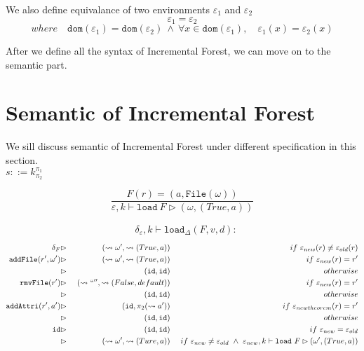 \documentclass[10pt,twoside,a4paper]{article}
\theoremstyle{theorem}
\theoremstyle{lemma}
\theoremstyle{property}
\theoremstyle{definition}
\theoremstyle{assumption}
\def\snd{\pi_2}
\def\id{\mathtt{id}}
\begin{document}
We also define equivalance of two environments $\varepsilon_1$ and $\varepsilon_2$
\begin{displaymath}
	\varepsilon_1 = \varepsilon_2
\end{displaymath}
\begin{displaymath}
	where \quad \mathtt{dom}(\varepsilon_1) = \mathtt{dom}(\varepsilon_2) ~\wedge~ \forall x \in \mathtt{dom}(\varepsilon_1), \quad \varepsilon_1(x) = \varepsilon_2(x)
\end{displaymath}

After we define all the syntax of Incremental Forest, we can move on to the semantic part.

\section{Semantic of Incremental Forest}

We sill discuss semantic of Incremental Forest under different specification in this section.\\

$\boxed{s ::= k^{\pi_1}_{\pi_2}}$

\begin{displaymath}
	\frac{F(r) = (a, \mathtt{File}(\omega))}
	{\varepsilon, k \vdash \mathtt{load}~F \rhd (\omega, (True, a))}
\end{displaymath}

\begin{align*}
	&\delta_\varepsilon, k \vdash \mathtt{load}_\Delta (F,v,d):
\end{align*}
\begin{align*}
	\delta_F					 &\rhd& ~(\leadsto \omega', \leadsto(True, a))			& &~if ~\varepsilon_{new}(r) \not= \varepsilon_{old}(r) \\
	\mathtt{addFile}(r',\omega') &\rhd& ~(\leadsto \omega', \leadsto(True, a))			& &~if ~\varepsilon_{new}(r) = r' \\
								 &\rhd& ~(\id,\id)								& &~otherwise \\
	\mathtt{rmvFile}(r') 		 &\rhd& ~(\leadsto `` '', \leadsto(False, default))			& &~if ~\varepsilon_{new}(r) = r' \\
								 &\rhd& ~(\id,\id)								& &~otherwise \\
	\mathtt{addAttri}(r', a')	 &\rhd& ~(\id, \snd(\leadsto a'))				& &~if ~\varepsilon_{newtheorem}(r) = r' \\
								 &\rhd& ~(\id,\id)								& &~otherwise	\\
	\mathtt{id}					 &\rhd& ~(\id,\id)								& &~ if ~\varepsilon_{new} = \varepsilon_{old}\\
								 &\rhd& ~(\leadsto \omega', \leadsto (Ture, a))				& &~ if ~\varepsilon_{new} \not= \varepsilon_{old} ~\wedge ~\varepsilon_{new}, k \vdash \mathtt{load}~F \rhd (\omega', (True, a))
\end{align*}
\end{document}
